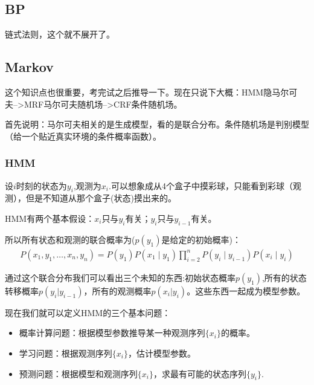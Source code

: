 \documentclass[12pt]{article}
\begin{document}
\subsection{BP}
链式法则，这个就不展开了。

\subsection{Markov}
这个知识点也很重要，考完试之后推导一下。现在只说下大概：HMM隐马尔可夫-->MRF马尔可夫随机场-->CRF条件随机场。

首先说明：马尔可夫相关的是生成模型，看的是联合分布。条件随机场是判别模型（给一个贴近真实环境的条件概率函数）。

\subsubsection{HMM}
设$i$时刻的状态为$y_i$,观测为$x_i$.可以想象成从4个盒子中摸彩球，只能看到彩球（观测），但是不知道从那个盒子(状态)摸出来的。

HMM有两个基本假设：$x_i$只与$y_i$有关；$y_i$只与$y_{i-1}$有关。

所以所有状态和观测的联合概率为($p(y_1)$是给定的初始概率)：
\begin{equation}
    \nonumber
    \begin{array}{l}
        P\left(x_{1}, y_{1}, \ldots, x_{n}, y_{n}\right)= 
        P\left(y_{1}\right) P\left(x_{1} \mid y_{1}\right) \prod_{i=2}^{n} P\left(y_{i} \mid y_{i-1}\right) P\left(x_{i} \mid y_{i}\right)
        \end{array}
\end{equation}

通过这个联合分布我们可以看出三个未知的东西:初始状态概率$p(y_1)$,所有的状态转移概率$p(y_i|y_{i-1})$，所有的观测概率$p(x_i|y_i)$。这些东西一起成为模型参数。

现在我们就可以定义HMM的三个基本问题：
\begin{itemize}
    \item 概率计算问题：根据模型参数推导某一种观测序列$\{x_i\}$的概率。
    \item 学习问题：根据观测序列$\{x_i\}$，估计模型参数。
    \item 预测问题：根据模型和观测序列$\{x_i\}$，求最有可能的状态序列$\{y_i\}$.
\end{itemize}
\end{document}
